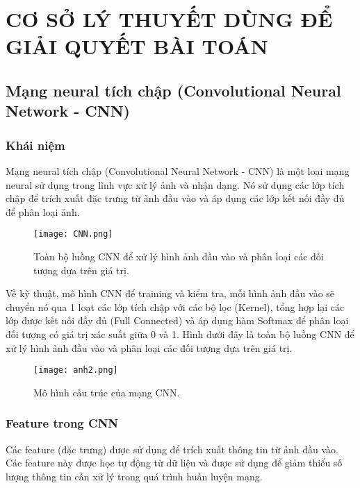 
\chapter{CƠ SỞ LÝ THUYẾT DÙNG ĐỂ GIẢI QUYẾT BÀI TOÁN} 

\label{Chapter2}

\section{Mạng neural tích chập (Convolutional Neural Network - CNN)}

\subsection{Khái niệm}

Mạng neural tích chập (Convolutional Neural Network - CNN) là một loại mạng neural sử dụng trong lĩnh vực xử lý ảnh và nhận dạng. Nó sử dụng các lớp tích chập để trích xuất đặc trưng từ ảnh đầu vào và áp dụng các lớp kết nối đầy đủ để phân loại ảnh. 

\begin{figure}[h!]
	\centering
	\texttt{[image: CNN.png]}
	\caption[Toàn bộ luồng CNN để xử lý hình ảnh đầu vào và phân loại các đối tượng dựa trên giá trị.]{Toàn bộ luồng CNN để xử lý hình ảnh đầu vào và phân loại các đối tượng dựa trên giá trị.}
	\label{fig:CNN} 
\end{figure}

Về kỹ thuật, mô hình CNN để training và kiểm tra, mỗi hình ảnh đầu vào sẽ chuyển nó qua 1 loạt các lớp tích chập với các bộ lọc (Kernel), tổng hợp lại các lớp được kết nối đầy đủ (Full Connected) và áp dụng hàm Softmax để phân loại đối tượng có giá trị xác suất giữa 0 và 1. Hình dưới đây là toàn bộ luồng CNN để xử lý hình ảnh đầu vào và phân loại các đối tượng dựa trên giá trị.

\begin{figure}[h!]
	\centering
	\texttt{[image: anh2.png]}
	\caption[Mô hình cấu trúc của mạng CNN.]{Mô hình cấu trúc của mạng CNN.}
	\label{fig:anh2} 
\end{figure}

\subsection{Feature trong CNN}

Các feature (đặc trưng) được sử dụng để trích xuất thông tin từ ảnh đầu vào. Các feature này được học tự động từ dữ liệu và được sử dụng để giảm thiểu số lượng thông tin cần xử lý trong quá trình huấn luyện mạng. 

